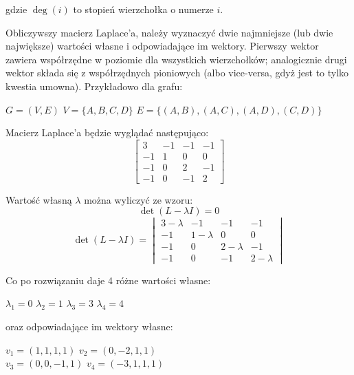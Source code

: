\documentclass[11pt,a4paper]{article}
\begin{document}
\noindent gdzie $\deg(i)$ to stopień wierzchołka o numerze $i$.

Obliczywszy macierz Laplace'a, należy wyznaczyć dwie najmniejsze (lub dwie największe) wartości własne i odpowiadające im wektory. Pierwszy wektor zawiera współrzędne w poziomie dla wszystkich wierzchołków; analogicznie drugi wektor składa się z współrzędnych pioniowych (albo vice-versa, gdyż jest to tylko kwestia umowna). Przykładowo dla grafu:

\begin{center}
\(G = (V, E)\) \quad \(V = \{A, B, C, D\}\) \quad \(E = \{(A, B), (A, C), (A, D), (C, D)\}\)

\vspace{1cm}

\end{center}

\noindent Macierz Laplace'a będzie wyglądać następująco:
\[\begin{bmatrix}
	3 & -1 & -1 & -1 \\
	-1 & 1 & 0 & 0 \\
	-1 & 0 & 2 & -1 \\
	-1 & 0 & -1 & 2
\end{bmatrix}\]

\noindent Wartość własną $\lambda$ można wyliczyć ze wzoru:
\[\det(L - \lambda I) = 0\]
\[\det(L - \lambda I) = \begin{vmatrix}
	3 - \lambda & -1 & -1 & -1 \\
	-1 & 1 - \lambda & 0 & 0 \\
	-1 & 0 & 2 - \lambda & -1 \\
	-1 & 0 & -1 & 2 - \lambda
\end{vmatrix}\]

\noindent Co po rozwiązaniu daje 4 różne wartości własne:
\begin{center}
\(\lambda_1 = 0\) \quad \(\lambda_2 = 1\) \quad \(\lambda_3 = 3\) \quad \(\lambda_4 = 4\)
\end{center}

\noindent oraz odpowiadające im wektory własne:
\begin{center}
\(v_1 = (1, 1, 1, 1)\) \quad \(v_2 = (0, -2, 1, 1)\) \\
\(v_3 = (0, 0, -1, 1)\) \quad \(v_4 = (-3, 1, 1, 1)\)
\end{center}
\end{document}
